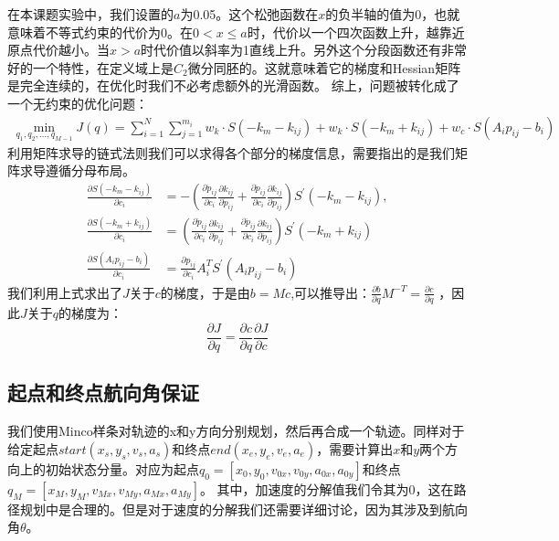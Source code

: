 \documentclass[master,academic]{ysuthesis} %
\begin{document}
		在本课题实验中，我们设置的$a$为0.05。这个松弛函数在$x$的负半轴的值为0，也就意味着不等式约束的代价为0。在$0<x \le a$时，代价以一个四次函数上升，越靠近原点代价越小。当$x>a$时代价值以斜率为1直线上升。另外这个分段函数还有非常好的一个特性，在定义域上是$C_2$微分同胚的。这就意味着它的梯度和Hessian矩阵是完全连续的，在优化时我们不必考虑额外的光滑函数。
		综上，问题被转化成了一个无约束的优化问题：
		\begin{equation}
			\begin{aligned}
				\min_{q_1,q_2,...,q_{M-1}}  J( q ) = \sum_{i=1}^N{\sum_{j=1}^{m_i}w_k\cdot{S( -k_m-k_{ij} ) +w_k\cdot S( -k_m+k_{ij} ) +w_c\cdot S( A_ip_{ij}-b_i )}}
			\end{aligned}
			\label{eq:单阶无约束优化代价}
		\end{equation}
		利用矩阵求导的链式法则我们可以求得各个部分的梯度信息，需要指出的是我们矩阵求导遵循分母布局。
		\begin{equation}
			\begin{aligned}
				\frac{\partial S( -k_m-k_{ij} )}{\partial c_i}&=-( \frac{\partial \dot{p}_{ij}}{\partial c_i}\frac{\partial k_{ij}}{\partial \dot{p}_{ij}}+\frac{\partial \ddot{p}_{ij}}{\partial c_i}\frac{\partial k_{ij}}{\partial \ddot{p}_{ij}} ) S^{'} ( -k_m-k_{ij} ) ,\\
				\frac{\partial S( -k_m+k_{ij} )}{\partial c_i}&=( \frac{\partial \dot{p}_{ij}}{\partial c_i}\frac{\partial k_{ij}}{\partial \dot{p}_{ij}}+\frac{\partial \ddot{p}_{ij}}{\partial c_i}\frac{\partial k_{ij}}{\partial \ddot{p}_{ij}} ) S^{'} ( -k_m+k_{ij} ) \\
				\frac{\partial S( A_ip_{ij}-b_i )}{\partial c_i}&=\frac{\partial p_{ij}}{\partial c_i}A_{i}^{T}S^{'}( A_ip_{ij}-b_i ) 
			\end{aligned}
		\end{equation}
		我们利用上式求出了$J$关于$c$的梯度，于是由$b = Mc$,可以推导出：$\frac{\partial b}{\partial q}M^{-T}=\frac{\partial c}{\partial q}$ ，因此$J$关于$q$的梯度为：
		\begin{equation}
			\frac{\partial J}{\partial q}=\frac{\partial c}{\partial q}\frac{\partial J}{\partial c}
		\end{equation}

		\subsection{起点和终点航向角保证}
		我们使用Minco样条对轨迹的x和y方向分别规划，然后再合成一个轨迹。同样对于给定起点$start(x_s,y_s,v_s,a_s)$和终点$end(x_e,y_e,v_e,a_e)$，需要计算出$x$和$y$两个方向上的初始状态分量。对应为起点$q_0=[x_0,y_0,v_{0x},v_{0y},a_{0x},a_{0y}]$和终点$q_M=[x_M,y_M,v_{Mx},v_{My},a_{Mx},a_{My}]$。 其中，加速度的分解值我们令其为0，这在路径规划中是合理的。但是对于速度的分解我们还需要详细讨论，因为其涉及到航向角$\theta$。
\end{document}
